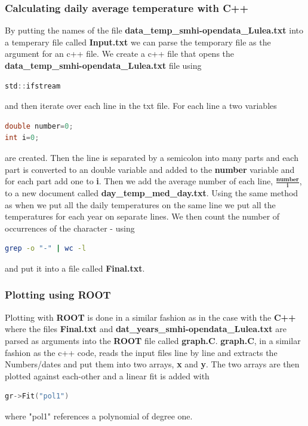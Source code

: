 \documentclass[a4paper]{article}
\begin{document}
\subsubsection{Calculating daily average temperature with C++}
By putting the names of the file \textbf{data\_temp\_smhi-opendata\_Lulea.txt} into a temperary file called \textbf{Input.txt} we can parse the temporary file as the argument for an c++ file. We create a c++ file that opens the \textbf{data\_temp\_smhi-opendata\_Lulea.txt} file using \begin{lstlisting}[language=C]
std::ifstream
\end{lstlisting} and then iterate over each line in the txt file. For each line a two variables \begin{lstlisting}[language=C]
double number=0;
int i=0;
\end{lstlisting} are created. Then the line is separated by a semicolon into many parts and each part is converted to an double variable and added to the \textbf{number} variable and for each part add one to \textbf{i}.
Then we add the average number of each line, $\frac{\textbf{number}}{\textbf{i}}$, to a new document called \textbf{day\_temp\_med\_day.txt}. Using the same method as when we put all the daily temperatures on the same line we put all the temperatures for each year on separate lines. We then count the number of occurrences of the character - using \begin{lstlisting}[language=Bash]
grep -o "-" | wc -l
\end{lstlisting} and put it into a file called \textbf{Final.txt}.

\subsubsection{Plotting using ROOT}
Plotting with \textbf{ROOT} is done in a similar fashion as in the case with the \textbf{C++} where the files \textbf{Final.txt} and \textbf{dat\_years\_smhi-opendata\_Lulea.txt} are parsed as arguments into the \textbf{ROOT} file called \textbf{graph.C}. \textbf{graph.C}, in a similar fashion as the c++ code, reads the input files line by line and extracts the Numbers/dates and put them into two arrays, \textbf{x} and \textbf{y}. The two arrays are then plotted against each-other and a linear fit is added with 
\begin{lstlisting}[language=C]
gr->Fit("pol1")
\end{lstlisting} where "pol1" references a polynomial of degree one.
\end{document}
